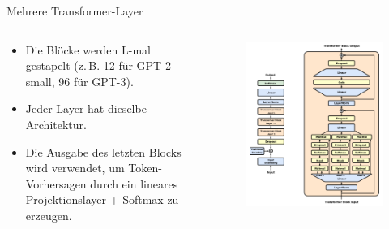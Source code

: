 \documentclass[aspectratio=1610, xcolor=dvipsnames, 9pt]{beamer}
\begin{document}
\begin{frame}{Mehrere Transformer-Layer}
  \begin{columns}
    \begin{column}{0.5\textwidth}
      \begin{itemize}
        \item Die Blöcke werden L-mal gestapelt (z. B. 12 für GPT-2 small, 96 für GPT-3).
        \item Jeder Layer hat dieselbe Architektur.
        \item Die Ausgabe des letzten Blocks wird verwendet, um Token-Vorhersagen durch ein lineares Projektionslayer + Softmax zu erzeugen.
      \end{itemize}
    \end{column}
    \begin{column}{0.5\textwidth}
      \begin{figure}
        \centering
        \includegraphics[width=0.8\columnwidth]{images/Full_GPT_architecture.png}
      \end{figure}
    \end{column}
  \end{columns}
\end{frame}
\end{document}
